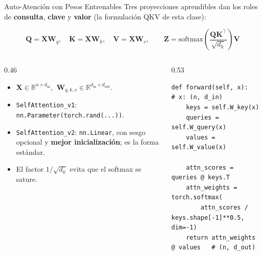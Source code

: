 \documentclass[aspectratio=169, 10pt]{beamer}
\providecommand{\R}{\mathbb{R}}
\newcommand{\softmax}{\mathrm{softmax}}
\newcommand{\formula}[1]{%
	\begin{tcolorbox}[colback=UCMBlue!8, colframe=UCMBlue, arc=4pt,
		boxsep=2pt, left=6pt, right=6pt, top=3pt, bottom=3pt]
		#1
	\end{tcolorbox}
}
\begin{document}
\begin{frame}[fragile]{Auto-Atenci\'on con Pesos Entrenables}
	Tres proyecciones aprendibles dan los roles de \textbf{consulta}, \textbf{clave} y \textbf{valor} (la formulaci\'on QKV de esta clase):
	\formula{
		\small
		\[
		\mathbf{Q}=\mathbf{X}\mathbf{W}_q,\quad \mathbf{K}=\mathbf{X}\mathbf{W}_k,\quad \mathbf{V}=\mathbf{X}\mathbf{W}_v,
		\qquad
		\mathbf{Z}=\softmax\!\left(\frac{\mathbf{Q}\mathbf{K}^\top}{\sqrt{d_k}}\right)\mathbf{V}
		\]
	}
	\vspace{-0.1cm}
	\begin{columns}[T]
		\begin{column}{0.46\textwidth}
			\small
			\begin{itemize}
				\item $\mathbf{X}\in\R^{n\times d_\text{in}}$, $\ \mathbf{W}_{q,k,v}\in\R^{d_\text{in}\times d_\text{out}}$.
				\item \texttt{SelfAttention\_v1}: \texttt{nn.Parameter(torch.rand(...))}.
				\item \texttt{SelfAttention\_v2}: \texttt{nn.Linear}, con sesgo opcional y \textbf{mejor inicializaci\'on}; es la forma est\'andar.
				\item El factor $1/\sqrt{d_k}$ evita que el softmax se sature.
			\end{itemize}
		\end{column}
		\begin{column}{0.53\textwidth}
			\scriptsize
			\begin{tcolorbox}[colback=LightGray, colframe=UCMNavy, arc=3pt, boxsep=1pt]
\begin{verbatim}
def forward(self, x):          # x: (n, d_in)
    keys = self.W_key(x)
    queries = self.W_query(x)
    values = self.W_value(x)

    attn_scores = queries @ keys.T
    attn_weights = torch.softmax(
        attn_scores / keys.shape[-1]**0.5, dim=-1)
    return attn_weights @ values   # (n, d_out)
\end{verbatim}
			\end{tcolorbox}
		\end{column}
	\end{columns}
\end{frame}
\end{document}
